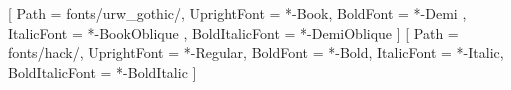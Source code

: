 \newunicodechar{ }{\symb  }






\usepackage{fvextra}


\usepackage{fontspec} 
\setmainfont{URWGothic}[
	Path = fonts/urw_gothic/,
	UprightFont = *-Book,
	BoldFont = *-Demi ,
	ItalicFont = *-BookOblique ,
	BoldItalicFont = *-DemiOblique
]
\setmonofont{Hack}[
	Path = fonts/hack/,
	UprightFont = *-Regular,
	BoldFont = *-Bold,
	ItalicFont = *-Italic,
	BoldItalicFont = *-BoldItalic
]
